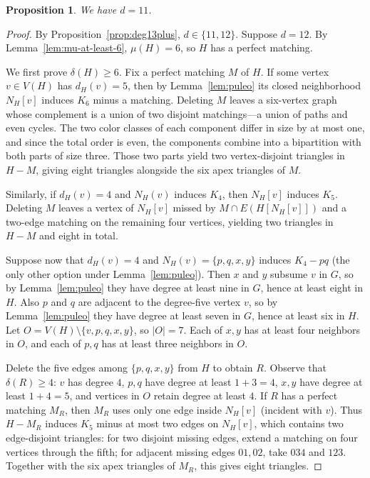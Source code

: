 \documentclass[11pt]{article}
\newtheorem{proposition}[theorem]{Proposition}
\begin{document}
\begin{proposition}\label{prop:deg12}
We have $d=11$.
\end{proposition}

\begin{proof}
By Proposition~\ref{prop:deg13plus}, $d\in\{11,12\}$. Suppose $d=12$. By Lemma~\ref{lem:mu-at-least-6}, $\mu(H)=6$, so $H$ has a perfect matching.

We first prove $\delta(H)\geq 6$. Fix a perfect matching $M$ of $H$. If some vertex $v\in V(H)$ has $d_H(v)=5$, then by Lemma~\ref{lem:puleo} its closed neighborhood $N_H[v]$ induces $K_6$ minus a matching. Deleting $M$ leaves a six-vertex graph whose complement is a union of two disjoint matchings—a union of paths and even cycles. The two color classes of each component differ in size by at most one, and since the total order is even, the components combine into a bipartition with both parts of size three. Those two parts yield two vertex-disjoint triangles in $H-M$, giving eight triangles alongside the six apex triangles of $M$.

Similarly, if $d_H(v)=4$ and $N_H(v)$ induces $K_4$, then $N_H[v]$ induces $K_5$. Deleting $M$ leaves a vertex of $N_H[v]$ missed by $M\cap E(H[N_H[v]])$ and a two-edge matching on the remaining four vertices, yielding two triangles in $H-M$ and eight in total.

Suppose now that $d_H(v)=4$ and $N_H(v)=\{p,q,x,y\}$ induces $K_4-pq$ (the only other option under Lemma~\ref{lem:puleo}). Then $x$ and $y$ subsume $v$ in $G$, so by Lemma~\ref{lem:puleo} they have degree at least nine in $G$, hence at least eight in $H$. Also $p$ and $q$ are adjacent to the degree-five vertex $v$, so by Lemma~\ref{lem:puleo} they have degree at least seven in $G$, hence at least six in $H$. Let $O=V(H)\setminus\{v,p,q,x,y\}$, so $|O|=7$. Each of $x,y$ has at least four neighbors in $O$, and each of $p,q$ has at least three neighbors in $O$.

Delete the five edges among $\{p,q,x,y\}$ from $H$ to obtain $R$. Observe that $\delta(R)\geq 4$: $v$ has degree $4$, $p,q$ have degree at least $1+3=4$, $x,y$ have degree at least $1+4=5$, and vertices in $O$ retain degree at least $4$. If $R$ has a perfect matching $M_R$, then $M_R$ uses only one edge inside $N_H[v]$ (incident with $v$). Thus $H-M_R$ induces $K_5$ minus at most two edges on $N_H[v]$, which contains two edge-disjoint triangles: for two disjoint missing edges, extend a matching on four vertices through the fifth; for adjacent missing edges $01,02$, take $034$ and $123$. Together with the six apex triangles of $M_R$, this gives eight triangles.


\end{proof}
\end{document}
